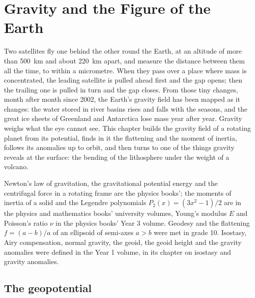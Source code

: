\chapter{Gravity and the Figure of the Earth}\label{ch:b3:gravity-geodesy}

Two satellites fly one behind the other round the Earth, at an altitude of more
than \qty{500}{km} and about \qty{220}{km} apart, and measure the distance
between them all the time, to within a micrometre.
When they pass over a place where mass is concentrated, the leading satellite
is pulled ahead first and the gap opens; then the trailing one is pulled in
turn and the gap closes. From those tiny changes, month after month since 2002,
the Earth's gravity field has been mapped as it changes: the water stored in
river basins rises and falls with the seasons, and the great ice sheets of
Greenland and Antarctica lose mass year after year. Gravity weighs what the eye
cannot see. This chapter builds the gravity field of a rotating planet from its
potential, finds in it the flattening and the moment of inertia, follows its
anomalies up to orbit, and then turns to one of the things gravity reveals at
the surface: the bending of the lithosphere under the weight of a volcano.

\begin{recall}
Newton's law of gravitation, the gravitational potential energy and the
centrifugal force in a rotating frame are the physics books'; the moments of
inertia of a solid and the Legendre polynomials $P_2(x) = (3x^2 - 1)/2$ are in
the physics and mathematics books' university volumes, Young's modulus $E$ and
Poisson's ratio $\nu$ in the physics books' Year 3 volume. Geodesy and the
flattening $f = (a - b)/a$ of an ellipsoid of semi-axes $a > b$ were met in
grade 10. Isostasy, Airy compensation, normal gravity, the geoid, the geoid
height and the gravity anomalies were defined in the Year 1 volume, in its
chapter on isostasy and gravity anomalies.
\end{recall}

\section{The geopotential}

